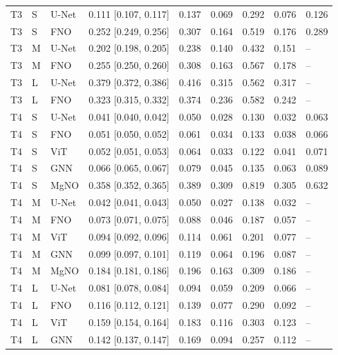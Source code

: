 \begin{table}[htbp]
\begin{tabular}{lllllllll}
T3 & S & U-Net & 0.111 [0.107, 0.117] & 0.137 & 0.069 & 0.292 & 0.076 & 0.126 \\
T3 & S & FNO & 0.252 [0.249, 0.256] & 0.307 & 0.164 & 0.519 & 0.176 & 0.289 \\
T3 & M & U-Net & 0.202 [0.198, 0.205] & 0.238 & 0.140 & 0.432 & 0.151 & -- \\
T3 & M & FNO & 0.255 [0.250, 0.260] & 0.308 & 0.163 & 0.567 & 0.178 & -- \\
T3 & L & U-Net & 0.379 [0.372, 0.386] & 0.416 & 0.315 & 0.562 & 0.317 & -- \\
T3 & L & FNO & 0.323 [0.315, 0.332] & 0.374 & 0.236 & 0.582 & 0.242 & -- \\
T4 & S & U-Net & 0.041 [0.040, 0.042] & 0.050 & 0.028 & 0.130 & 0.032 & 0.063 \\
T4 & S & FNO & 0.051 [0.050, 0.052] & 0.061 & 0.034 & 0.133 & 0.038 & 0.066 \\
T4 & S & ViT & 0.052 [0.051, 0.053] & 0.064 & 0.033 & 0.122 & 0.041 & 0.071 \\
T4 & S & GNN & 0.066 [0.065, 0.067] & 0.079 & 0.045 & 0.135 & 0.063 & 0.089 \\
T4 & S & MgNO & 0.358 [0.352, 0.365] & 0.389 & 0.309 & 0.819 & 0.305 & 0.632 \\
T4 & M & U-Net & 0.042 [0.041, 0.043] & 0.050 & 0.027 & 0.138 & 0.032 & -- \\
T4 & M & FNO & 0.073 [0.071, 0.075] & 0.088 & 0.046 & 0.187 & 0.057 & -- \\
T4 & M & ViT & 0.094 [0.092, 0.096] & 0.114 & 0.061 & 0.201 & 0.077 & -- \\
T4 & M & GNN & 0.099 [0.097, 0.101] & 0.119 & 0.064 & 0.196 & 0.087 & -- \\
T4 & M & MgNO & 0.184 [0.181, 0.186] & 0.196 & 0.163 & 0.309 & 0.186 & -- \\
T4 & L & U-Net & 0.081 [0.078, 0.084] & 0.094 & 0.059 & 0.209 & 0.066 & -- \\
T4 & L & FNO & 0.116 [0.112, 0.121] & 0.139 & 0.077 & 0.290 & 0.092 & -- \\
T4 & L & ViT & 0.159 [0.154, 0.164] & 0.183 & 0.116 & 0.303 & 0.123 & -- \\
T4 & L & GNN & 0.142 [0.137, 0.147] & 0.169 & 0.094 & 0.257 & 0.112 & -- \\
\bottomrule
\end{tabular}
\end{table}
